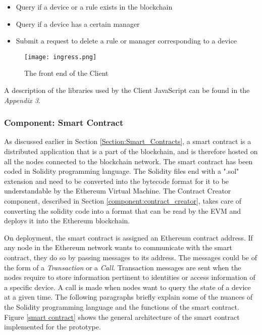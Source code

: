 \documentclass[english]{tktltiki}
\begin{document}
\begin{itemize}
\item Query if a device or a rule exists in the blockchain
\item Query if a device has a certain manager
\item Submit a request to delete a rule or manager corresponding to a device 
\end{itemize} 


\begin{figure}[H]
\begin{center}
\texttt{[image: ingress.png]}

\caption{The front end of the Client}
\label{dapp}
\end{center}
\end{figure}
A description of the libraries used by the Client JavaScript can be found in the \textit{Appendix 3}.


\subsubsection{Component: Smart Contract}

As discussed earlier in Section \ref{Section:Smart_Contracts}, a smart contract is a distributed application that is a part of the blockchain, and is therefore hosted on all the nodes connected to the blockchain network. The smart contract has been coded in Solidity programming language. The Solidity files end with a ".sol" extension and need to be converted into the bytecode format for it to be understandable by the Ethereum Virtual Machine. The Contract Creator component, described in Section \ref{component:contract_creator}, takes care of converting the solidity code into a format that can be read by the EVM and deploys it into the Ethereum blockchain.

On deployment, the smart contract is assigned an Ethereum contract address. If any node in the Ethereum network wants to communicate with the smart contract, they do so by passing messages to its address. The messages could be of the form of a \textit{Transaction} or a \textit{Call}. Transaction messages are sent when the nodes require to store information pertinent to identities or access information of a specific device. A call is made when nodes want to query the state of a device at a given time. The following paragraphs briefly explain some of the nuances of the Solidity programming language and the functions of the smart contract. Figure \ref{smart contract} shows the general architecture of the smart contract implemented for the prototype.\newline
\end{document}
